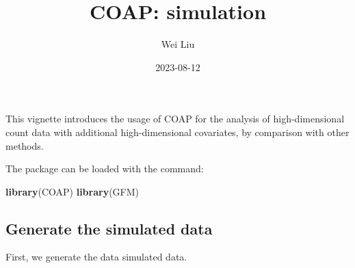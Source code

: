 \documentclass[
]{article}
\title{COAP: simulation}
\author{Wei Liu}
\date{2023-08-12}
\newenvironment{Shaded}{\begin{snugshade}}{\end{snugshade}}
\newcommand{\DataTypeTok}[1]{\textcolor[rgb]{0.13,0.29,0.53}{#1}}
\newcommand{\DecValTok}[1]{\textcolor[rgb]{0.00,0.00,0.81}{#1}}
\newcommand{\KeywordTok}[1]{\textcolor[rgb]{0.13,0.29,0.53}{\textbf{#1}}}
\newcommand{\NormalTok}[1]{#1}
\newcommand{\OperatorTok}[1]{\textcolor[rgb]{0.81,0.36,0.00}{\textbf{#1}}}
\newcommand{\StringTok}[1]{\textcolor[rgb]{0.31,0.60,0.02}{#1}}
\begin{document}
\maketitle

This vignette introduces the usage of COAP for the analysis of
high-dimensional count data with additional high-dimensional covariates,
by comparison with other methods.

The package can be loaded with the command:

\begin{Shaded}
\begin{Highlighting}[]
\KeywordTok{library}\NormalTok{(COAP)}
\KeywordTok{library}\NormalTok{(GFM)}
\end{Highlighting}
\end{Shaded}

\hypertarget{generate-the-simulated-data}{%
\subsection{Generate the simulated
data}\label{generate-the-simulated-data}}

First, we generate the data simulated data.

\begin{Shaded}
\end{Shaded}
\end{document}
